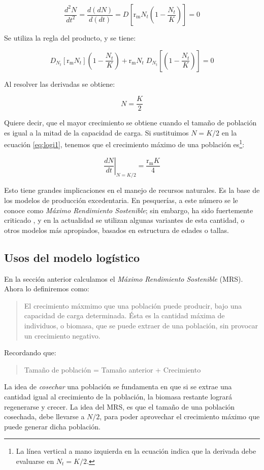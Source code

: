 \documentclass[12pt,letterpaper,]{book}
\let\rmarkdownfootnote\footnote%
\def\footnote{\protect\rmarkdownfootnote}
\begin{document}
\[
\frac{d^2N}{dt^2}=\frac{d(dN)}{d(dt)}=D\left[ \mathrm{r_m}N_t\left(1-\frac{N_t}{K}\right)\right]=0
\]

Se utiliza la regla del producto, y se tiene:

\[
D_{N_t}\left[ \mathrm{r_m}N_t \right]\left(1-\frac{N_t}{K}\right) + \mathrm{r_m}N_t\; D_{N_t}\left[\left(1-\frac{N_t}{K}\right)\right]=0
\]

Al resolver las derivadas se obtiene:

\[
N = \frac{K}{2}
\]

Quiere decir, que el mayor crecimiento se obtiene cuando el tamaño de
población es igual a la mitad de la capacidad de carga. Si sustituimos
\(N = K/2\) en la ecuación \eqref{eq:logi1}, tenemos que el crecimiento
máximo de una población
es\footnote{La línea vertical a mano izquierda en la ecuación indica que la derivada debe evaluarse en $N_t=K/2$.}:

\[
\left. \frac{dN}{dt}\right|_{N = K/2} = \frac{\mathrm{r_m}K}{4}
\]

Esto tiene grandes implicaciones en el manejo de recursos naturales. Es
la base de los modelos de producción excedentaria. En pesquerías, a este
número se le conoce como \emph{Máximo Rendimiento Sostenible}; sin
embargo, ha sido fuertemente criticado \citep{Larkin1977}, y en la
actualidad se utilizan algunas variantes de esta cantidad, o otros
modelos más apropiados, basados en estructura de edades o tallas.

\subsection{Usos del modelo logístico}\label{usos-del-modelo-logistico}

En la sección anterior calculamos el \emph{Máximo Rendimiento
Sostenible} (MRS). Ahora lo definiremos como:

\begin{quote}
El crecimiento máxmimo que una población puede producir, bajo una
capacidad de carga determinada. Ésta es la cantidad máxima de
individuos, o biomasa, que se puede extraer de una población, sin
provocar un crecimiento negativo.
\end{quote}

Recordando que:

\begin{quote}
Tamaño de población = Tamaño anterior + Crecimiento
\end{quote}

La idea de \emph{cosechar} una población se fundamenta en que si se
extrae una cantidad igual al crecimiento de la población, la biomasa
restante logrará regenerarse y crecer. La idea del MRS, es que el tamaño
de una población cosechada, debe llevarse a \(N/2\), para poder
aprovechar el crecimiento máximo que puede generar dicha población.
\end{document}
